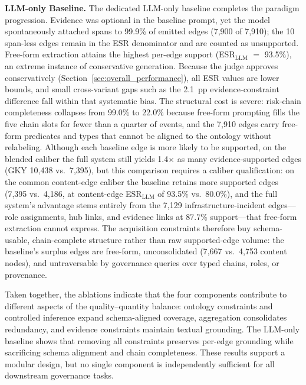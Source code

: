 \documentclass[a4paper,fleqn]{cas-dc}
\begin{document}
\textbf{LLM-only Baseline.}
The dedicated LLM-only baseline completes the paradigm progression.
Evidence was optional in the baseline prompt, yet the model
spontaneously attached spans to 99.9\% of emitted edges (7{,}900 of
7{,}910); the 10 span-less edges remain in the ESR denominator and
are counted as unsupported.
Free-form extraction attains the highest per-edge support
(ESR$_{\text{LLM}}$ $=$ 93.5\%), an extreme instance of
conservative generation.
Because the judge approves conservatively
(Section~\ref{sec:overall_performance}), all ESR values are lower
bounds, and small cross-variant gaps such as the 2.1~pp
evidence-constraint difference fall within that systematic bias.
The structural cost is severe: risk-chain completeness collapses
from 99.0\% to 22.0\% because free-form prompting fills the five
chain slots for fewer than a quarter of events, and the 7{,}910 edges
carry free-form predicates and types that cannot be aligned to the
ontology without relabeling.
Although each baseline edge is more likely to be supported,
on the blended caliber the full system still yields 1.4$\times$ as
many evidence-supported edges (GKY 10{,}438 vs.\ 7{,}395), but this
comparison requires a caliber qualification: on the common
content-edge caliber the baseline retains more supported edges
(7{,}395 vs.\ 4{,}186, at content-edge ESR$_{\text{LLM}}$ of
93.5\% vs.\ 80.0\%), and the full system's advantage stems entirely
from the 7{,}129 infrastructure-incident edges---role assignments,
hub links, and evidence links at 87.7\% support---that free-form
extraction cannot express.
The acquisition constraints therefore buy schema-usable,
chain-complete structure rather than raw supported-edge volume: the
baseline's surplus edges are free-form, unconsolidated (7{,}667 vs.\
4{,}753 content nodes), and untraversable by governance queries over
typed chains, roles, or provenance.

Taken together, the ablations indicate that the four components
contribute to different aspects of the quality--quantity balance:
ontology constraints and controlled inference expand schema-aligned
coverage, aggregation consolidates redundancy, and evidence
constraints maintain textual grounding.
The LLM-only baseline shows that removing all constraints preserves
per-edge grounding while sacrificing schema alignment and chain
completeness.
These results support a modular design, but no single component is
independently sufficient for all downstream governance tasks.

\end{document}
